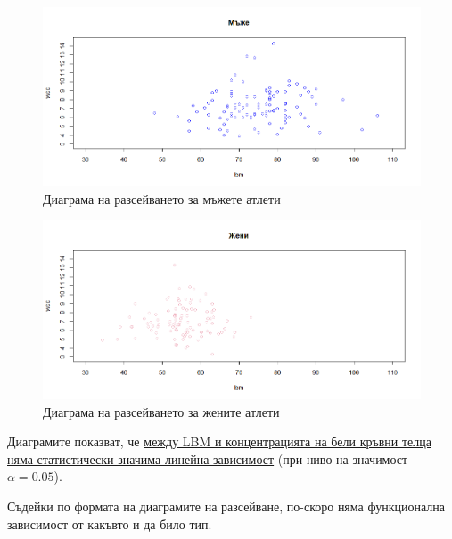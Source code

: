 \documentclass[12pt]{article}
\begin{document}
\begin{large}
\begin{figure}[!h!]
\includegraphics[width=\textwidth,height=\textheight,keepaspectratio]{pics/scattermen}
\caption{Диаграма на разсейването за мъжете атлети}
\end{figure}

\clearpage
\begin{figure}[!h!]
\includegraphics[width=\textwidth,height=\textheight,keepaspectratio]{pics/scatterwomen2}
\caption{Диаграма на разсейването за жените атлети}
\end{figure}

Диаграмите показват, че \uline{между LBM и концентрацията на бели кръвни телца няма статистически значима линейна зависимост} (при ниво на значимост $\alpha=0.05$). \par
Съдейки по формата на диаграмите на разсейване, по-скоро няма функционална зависимост от какъвто и да било тип.


\end{large}
\end{document}
